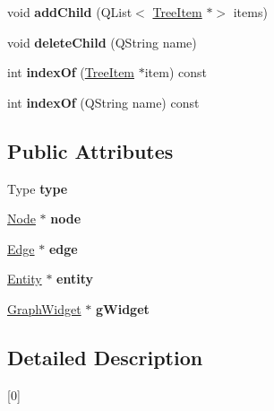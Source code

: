 \begin{DoxyCompactItemize}
void {\bfseries add\+Child} (Q\+List$<$ \hyperlink{class_tree_item}{Tree\+Item} $\ast$$>$ items)
\item 
\mbox{\label{class_tree_item_a4ce6d5d9f0dfa75357809c3f23049708}} 
void {\bfseries delete\+Child} (Q\+String name)
\item 
\mbox{\label{class_tree_item_a397b1d70336578b74106f2d2856711e2}} 
int {\bfseries index\+Of} (\hyperlink{class_tree_item}{Tree\+Item} $\ast$item) const
\item 
\mbox{\label{class_tree_item_a336fbf8dcae672aa540b2c6ce3606fa3}} 
int {\bfseries index\+Of} (Q\+String name) const
\end{DoxyCompactItemize}
\subsection*{Public Attributes}
\begin{DoxyCompactItemize}
\item 
\mbox{\label{class_tree_item_ac2f2f49b3424c26fd7eba3505c99b7f4}} 
Type {\bfseries type}
\item 
\mbox{\label{class_tree_item_aa84f796368189baa3c544027d2c179fe}} 
\hyperlink{class_node}{Node} $\ast$ {\bfseries node}
\item 
\mbox{\label{class_tree_item_ad94541ec15a04f22f623412a2bfe06e0}} 
\hyperlink{class_edge}{Edge} $\ast$ {\bfseries edge}
\item 
\mbox{\label{class_tree_item_ad9ed2f72a99e42fa0b09bf6d49baecd7}} 
\hyperlink{class_entity}{Entity} $\ast$ {\bfseries entity}
\item 
\mbox{\label{class_tree_item_a39d1f9d021d8eb9d5412160fc985f950}} 
\hyperlink{class_graph_widget}{Graph\+Widget} $\ast$ {\bfseries g\+Widget}
\end{DoxyCompactItemize}


\subsection{Detailed Description}
\mbox{[}0\mbox{]} 

